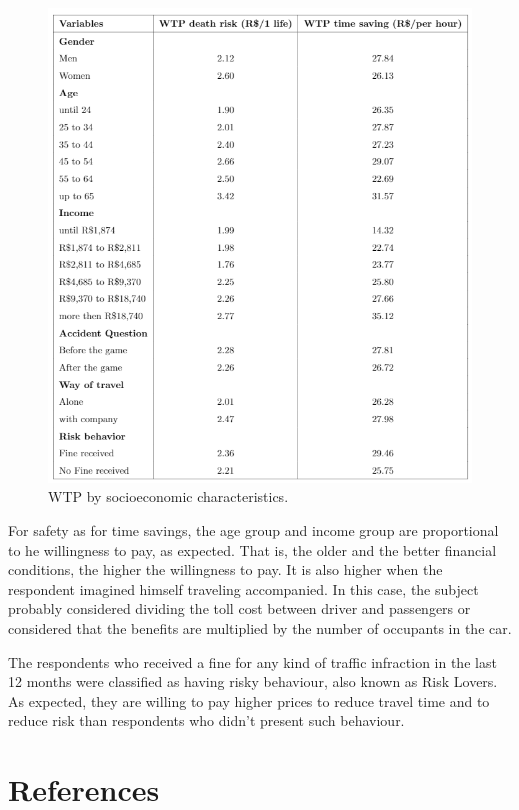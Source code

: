 \documentclass[]{elsarticle} %
\makeatletter
\def\maxwidth{\ifdim\Gin@nat@width>\linewidth\linewidth
\else\Gin@nat@width\fi}
\let\Oldincludegraphics\includegraphics
\renewcommand{\includegraphics}[1]{\Oldincludegraphics[width=\maxwidth]{#1}}
\makeatother
\begin{document}
\begin{figure}
\centering
\includegraphics{WTPsocio.png}
\caption{WTP by socioeconomic characteristics.}
\end{figure}

For safety as for time savings, the age group and income group are
proportional to he willingness to pay, as expected. That is, the older
and the better financial conditions, the higher the willingness to pay.
It is also higher when the respondent imagined himself traveling
accompanied. In this case, the subject probably considered dividing the
toll cost between driver and passengers or considered that the benefits
are multiplied by the number of occupants in the car.

The respondents who received a fine for any kind of traffic infraction
in the last 12 months were classified as having risky behaviour, also
known as Risk Lovers. As expected, they are willing to pay higher prices
to reduce travel time and to reduce risk than respondents who didn't
present such behaviour.

\hypertarget{references}{%
\section*{References}\label{references}}
\end{document}
